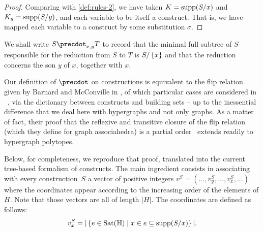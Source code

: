 \begin{proof}
  Comparing with \cref{def:rules-2}, we have taken $K=\operatorname{supp}(S/x)$ and $K_y=\operatorname{supp}(S/y)$, and each variable to be itself a construct. 
  That is, we have mapped each variable to a construct by some substitution $\sigma$.
\end{proof}

We shall write $S\precdot_{x,y} T$ to record that the  minimal full subtree of $S$ responsible for the reduction from $S$ to $T$ is $S/\left\{x\right\}$ and that the reduction concerns the son $y$ of $x$, together with $x$.

Our definition of $\precdot$ on constructions is equivalent to the flip relation given by  Barnard and McConville in \cite{Barnard-McConville}, of which particular cases are considered in ~\cite{Forcey-Tamari}, via the dictionary between constructs and building sets -- up to the inessential difference that we deal here with hypergraphs and not only graphs.
As a matter of fact, their proof that the  reflexive and transitive closure of the flip relation (which they define for graph associahedra) is a partial order~\cite[Lem.~2.8]{Barnard-McConville} extends readily to hypergraph polytopes.

Below, for completeness, we reproduce that proof, translated into the current tree-based formalism of constructs. 
The main ingredient consists in associating with every construction~$S$ a vector of positive integers $v^S=(\ldots,v^S_y,\ldots,v^S_x,\ldots)$ where the coordinates appear according to the increasing order of the elements of $H$. Note that those vectors are all of length $|H|$.
The coordinates are defined as follows: 
$$v^S_x=|\left\{e\in{\operatorname{Sat}}({\mathbb H}) \mid x\in e\subseteq \operatorname{supp}(S/x)\right\}|.$$

